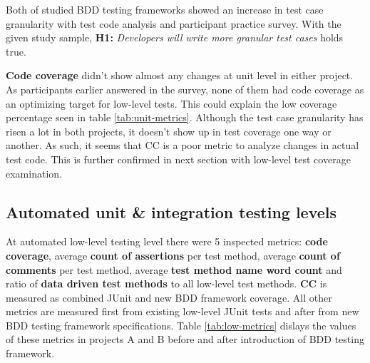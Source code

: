 Both of studied BDD testing frameworks showed an increase in test case granularity with test code analysis and participant practice
survey. With the given study sample, \textbf{H1:} \textit{Developers will write more granular test cases} holds true.

\textbf{Code coverage} didn't show almost any changes at unit level in either project. As participants earlier answered in the survey, none
of them had code coverage as an optimizing target for low-level tests. This could explain the low coverage percentage seen in
table \ref{tab:unit-metrics}. Although the test case granularity has risen a lot in both projects, it doesn't
show up in test coverage one way or another. As such, it seems that CC is a poor metric to analyze changes in actual test
code. This is further confirmed in next section with low-level test coverage examination.

\subsection{Automated unit \& integration testing levels}
\label{subsub:low-level-metrics}
At automated low-level testing level there were 5 inspected metrics: \textbf{code coverage}, average \textbf{count of assertions} per test method,
average \textbf{count of comments} per test method, average \textbf{test method name word count} and ratio of \textbf{data driven test methods} to
all low-level test methods. \textbf{CC} is measured as combined JUnit and new BDD framework coverage. All other metrics
are measured first from existing low-level JUnit tests and after from new BDD testing framework specifications.
Table \ref{tab:low-metrics} dislays the values of these metrics in projects A and B before and after introduction of BDD testing framework.


